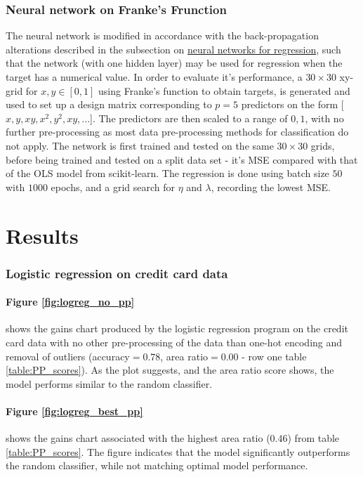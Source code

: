 \documentclass[%
oneside,                 %
final,                   %
10pt]{article}
\begin{document}
\subsubsection{Neural network on Franke's Frunction} \label{FF_NN}
The neural network is modified in accordance with the back-propagation alterations described in the subsection on  \hyperref[Section_M_NNregression]{neural networks for regression}, such that the network (with one hidden layer) may be used for regression when the target has a numerical value. In order to evaluate it's performance, a $30 \times 30$ xy-grid for $x,y\in [0,1]$ using Franke's function \cite{P1_JN} to obtain targets, is generated and used to set up a design matrix corresponding to $p=5$ predictors on the form [$x,y,xy,x^2,y^2,xy, ...$]. The predictors are then scaled to a range of $0,1$, with no further pre-processing as most data pre-processing methods for classification do not apply. The network is first trained and tested on the same $30 \times 30$ grids, before being trained and tested on a split data set -  it's MSE compared with that of the OLS model from scikit-learn. The regression is done using batch size $50$ with $1000$ epochs, and a grid search for $\eta$ and $\lambda$, recording the lowest MSE.

\section{Results} \label{Section_Results}
\subsubsection{Logistic regression on credit card data}\label{results_evaluation_pp}
\paragraph{Figure \ref{fig:logreg_no_pp}} shows the gains chart produced by the logistic regression program on the credit card data with no other pre-processing of the data than one-hot encoding and removal of outliers (accuracy$=0.78$, area ratio$=0.00$ - row one table \ref{table:PP_scores}). As the plot suggests, and the area ratio score shows, the model performs similar to the random classifier.

\paragraph{Figure \ref{fig:logreg_best_pp}}  shows the gains chart associated with the highest area ratio ($0.46$) from table \ref{table:PP_scores}. The figure indicates that the model significantly outperforms the random classifier, while not matching optimal model performance.
\end{document}
